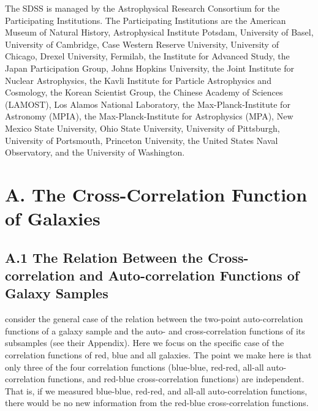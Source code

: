 \documentclass[]{emulateapj}
\begin{document}
    The SDSS is managed by the Astrophysical Research Consortium for the Participating Institutions. The Participating Institutions are the American Museum of Natural History, Astrophysical Institute Potsdam, University of Basel, University of Cambridge, Case Western Reserve University, University of Chicago, Drexel University, Fermilab, the Institute for Advanced Study, the Japan Participation Group, Johns Hopkins University, the Joint Institute for Nuclear Astrophysics, the Kavli Institute for Particle Astrophysics and Cosmology, the Korean Scientist Group, the Chinese Academy of Sciences (LAMOST), Los Alamos National Laboratory, the Max-Planck-Institute for Astronomy (MPIA), the Max-Planck-Institute for Astrophysics (MPA), New Mexico State University, Ohio State University, University of Pittsburgh, University of Portsmouth, Princeton University, the United States Naval Observatory, and the University of Washington.

\smallskip
\appendix

\section{A. The Cross-Correlation Function of Galaxies}
\label{sec:appendix}

\subsection{A.1 The Relation Between the Cross-correlation and Auto-correlation 
Functions of Galaxy Samples}

\cite{zu08} consider the general case of the relation between the two-point 
auto-correlation functions of a galaxy sample and the auto- and 
cross-correlation functions of its subsamples (see their Appendix). Here we 
focus on the specific case of the correlation functions of red, blue and all 
galaxies. The point we make here is that only three of the four correlation
functions (blue-blue, red-red, all-all auto-correlation functions, and 
red-blue cross-correlation functions) are independent. That is, if we measured 
blue-blue, red-red, and all-all auto-correlation functions, there would be no 
new information from the red-blue cross-correlation functions. 
\end{document}
